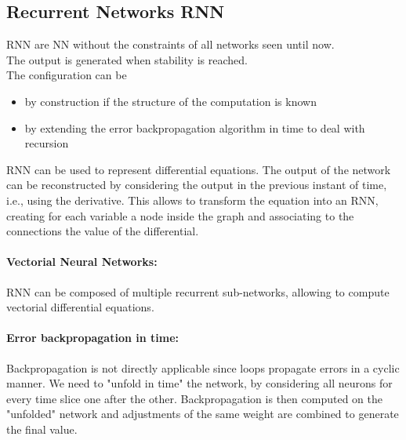 \subsection{Recurrent Networks RNN}
RNN are NN without the constraints of all networks seen until now.\\
The output is generated when stability is reached.\\

The configuration can be
\begin{itemize}
	\item by construction if the structure of the computation is known
	\item by extending the error backpropagation algorithm in time to deal with recursion
\end{itemize}

RNN can be used to represent differential equations. The output of the network can be reconstructed by considering the output in the previous instant of time, i.e., using the derivative. This allows to transform the equation into an RNN, creating for each variable a node inside the graph and associating to the connections the value of the differential.\\

\paragraph{Vectorial Neural Networks:} RNN can be composed of multiple recurrent sub-networks, allowing to compute vectorial differential equations.\\

\paragraph{Error backpropagation in time:} Backpropagation is not directly applicable since loops propagate errors in a cyclic manner. We need to "unfold in time" the network, by considering all neurons for every time slice one after the other. Backpropagation is then computed on the "unfolded" network and adjustments of the same weight are combined to generate the final value.\\